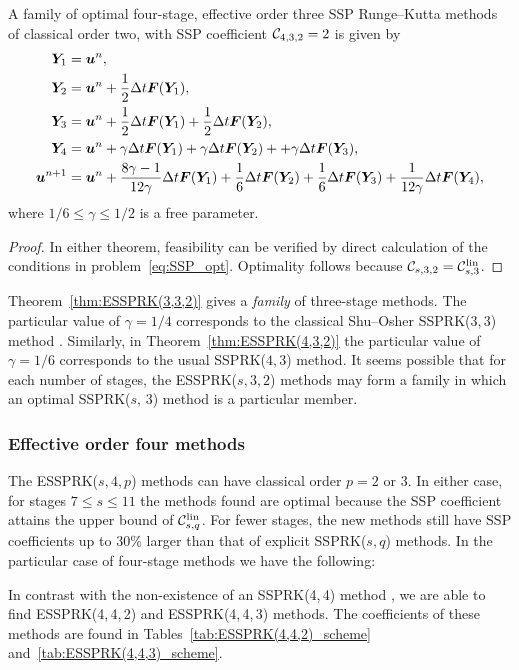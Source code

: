 \documentclass{siamltex}  %
\begin{document}
\begin{theorem}\label{thm:ESSPRK(4,3,2)}
	A family of optimal four-stage, effective order three SSP Runge--Kutta 
	methods of classical order two, with SSP coefficient $\mathcal{C}_{4,3,2} = 2$ is given by
    \begin{displaymath}
    		\begin{split}
    			\bm{Y}_1 &= \bm{u}^n, \\
    			\bm{Y}_2 &= \bm{u}^n + \frac{1}{2}\Delta t\bm{F}(\bm{Y}_1), \\
    			\bm{Y}_3 &= \bm{u}^n + \frac{1}{2}\Delta t\bm{F}(\bm{Y}_1) + \frac{1}{2}\Delta t\bm{F}(\bm{Y}_2), \\
    			\bm{Y}_4 &= \bm{u}^n + \gamma\Delta t\bm{F}(\bm{Y}_1) + \gamma\Delta t\bm{F}(\bm{Y}_2) + + \gamma\Delta t\bm{F}(\bm{Y}_3), \\
    			\bm{u}^{n+1} &= \bm{u}^n + \frac{8\gamma-1}{12\gamma}\Delta t\bm{F}(\bm{Y}_1) + \frac{1}{6}\Delta t\bm{F}(\bm{Y}_2) + \frac{1}{6}\Delta t\bm{F}(\bm{Y}_3) + \frac{1}{12\gamma}\Delta t\bm{F}(\bm{Y}_4),
        \end{split}
    \end{displaymath}
    where $ 1/6 \leq \gamma \leq 1/2 $ is a free parameter.
\end{theorem}
\begin{proof}
	In either theorem, feasibility can be verified by direct calculation of the 
	conditions in problem~\eqref{eq:SSP_opt}. Optimality follows because 
	$\mathcal{C}_{s,3,2} = \mathcal{C}^{\textnormal{lin}}_{s,3}$.
\end{proof}

Theorem~\ref{thm:ESSPRK(3,3,2)} gives a \emph{family} of three-stage 
methods. 
The particular value of $\gamma = 1/4$ corresponds to the classical
Shu--Osher SSPRK($3,3$) method \cite{Gottlieb/Shu:1998}.
Similarly, in Theorem~\ref{thm:ESSPRK(4,3,2)} the particular value of 
$\gamma = 1/6$ corresponds to the usual SSPRK($4,3$) method.
It seems possible that for each number of stages, the 
ESSPRK($s, 3, 2$) methods may form a family in which an optimal 
SSPRK($s$, $3$) method is a particular member. 

\subsubsection{Effective order four methods}\label{subsubsec:4th_ESSPRK}
The ESSPRK($s,4,p$) methods can have classical order $p=2$ or $3$.
In either case, for stages $7 \le s \le 11$ the methods found are
optimal because the SSP coefficient attains the upper bound of
$\mathcal{C}^{\textnormal{lin}}_{s,q}$.
For fewer stages, the new methods still have SSP coefficients up to
30\% larger than that of explicit SSPRK($s,q$) methods.
In the particular case of four-stage methods we have the following:
\begin{remark}
	In contrast with the non-existence of an SSPRK(4,\,4) method 
	\cite{Gottlieb/Shu:1998,Ruuth2002}, 
	we are able to find ESSPRK(4,\,4,\,2) and ESSPRK(4,\,4,\,3) methods.
	The coefficients of these methods are found in
	Tables~\ref{tab:ESSPRK(4,4,2)_scheme}
	and~\ref{tab:ESSPRK(4,4,3)_scheme}.
\end{remark}
\end{document}
